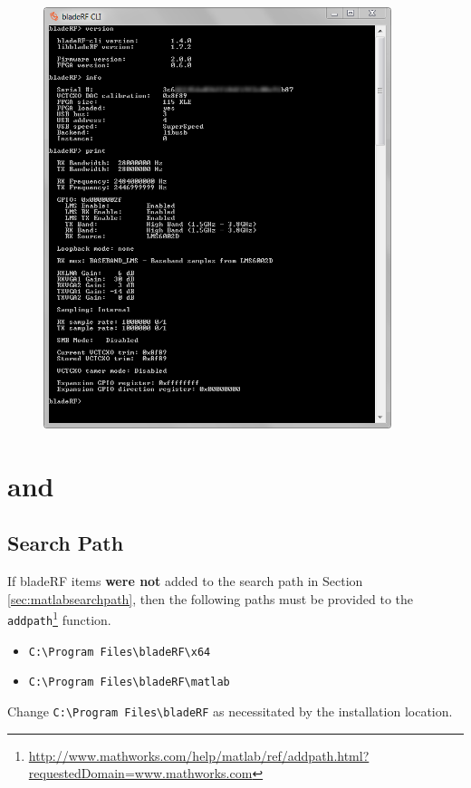 {\begin{figure}[h]
  \centering
  \includegraphics[width=4in]{images/windows/bladeRF-cli/cli-info.png}
\end{figure}

\newpage
\section{\matlab and \simulink}

\subsection{\matlab Search Path}

If bladeRF items \textbf{were not} added to the \matlab search path in Section
\ref{sec:matlabsearchpath}, then the following paths must be provided to
the \texttt{addpath}\footnote{\url{http://www.mathworks.com/help/matlab/ref/addpath.html?requestedDomain=www.mathworks.com}} function.

\begin{itemize}
  \item \texttt{C:\textbackslash Program Files\textbackslash bladeRF\textbackslash x64}
  \item \texttt{C:\textbackslash Program Files\textbackslash bladeRF\textbackslash matlab}
\end{itemize}

Change \texttt{C:\textbackslash Program Files\textbackslash bladeRF} as necessitated by the installation location.

}
